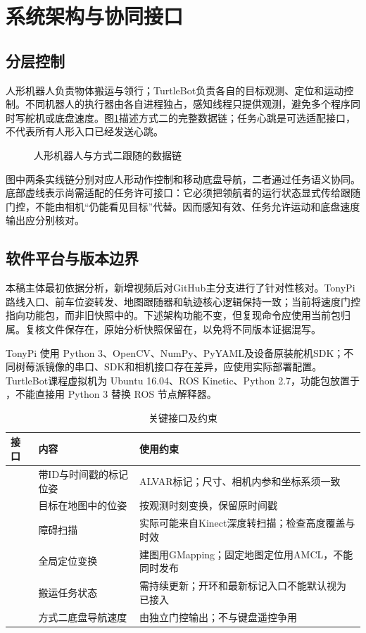 \section{系统架构与协同接口}
\subsection{分层控制}
人形机器人负责物体搬运与领行；TurtleBot负责各自的目标观测、定位和运动控制。不同机器人的执行器由各自进程独占，感知线程只提供观测，避免多个程序同时写舵机或底盘速度。图\ref{fig:architecture}描述方式二的完整数据链；任务心跳是可选适配接口，不代表所有人形入口已经发送心跳。
\begin{figure}[H]\centering

\caption{人形机器人与方式二跟随的数据链}\label{fig:architecture}
\end{figure}

图中两条实线链分别对应人形动作控制和移动底盘导航，二者通过任务语义协同。底部虚线表示尚需适配的任务许可接口：它必须把领航者的运行状态显式传给跟随门控，不能由相机“仍能看见目标”代替。因而感知有效、任务允许运动和底盘速度输出应分别核对。


\subsection{软件平台与版本边界}
本稿主体最初依据分析，新增视频后对GitHub主分支进行了针对性核对。TonyPi路线入口、前车位姿转发、地图跟随器和轨迹核心逻辑保持一致；当前将速度门控指向功能包，而非旧快照中的。下述架构功能不变，但复现命令应使用当前包归属。复核文件保存在，原始分析快照保留在，以免将不同版本证据混写\cite{repo-current}。

TonyPi 使用 Python 3、OpenCV、NumPy、PyYAML及设备原装舵机SDK；不同树莓派镜像的串口、SDK和相机接口存在差异，应使用实际部署配置。TurtleBot课程虚拟机为 Ubuntu 16.04、ROS Kinetic、Python 2.7，功能包放置于 ，不能直接用 Python 3 替换 ROS 节点解释器。

\begin{table}[H]\centering\small
\caption{关键接口及约束}
\begin{tabularx}{\linewidth}{p{37mm}p{40mm}Y}\toprule
接口 & 内容 & 使用约束\\\midrule
{} & 带ID与时间戳的标记位姿 & ALVAR标记；尺寸、相机内参和坐标系须一致\\
 & 目标在地图中的位姿 & 按观测时刻变换，保留原时间戳\\
 & 障碍扫描 & 实际可能来自Kinect深度转扫描；检查高度覆盖与时效\\
 & 全局定位变换 & 建图用GMapping；固定地图定位用AMCL，不能同时发布\\
 & 搬运任务状态 & 需持续更新；开环和最新标记入口不能默认视为已接入\\
 & 方式二底盘导航速度 & 由独立门控输出；不与键盘遥控争用\\\bottomrule
\end{tabularx}\end{table}

